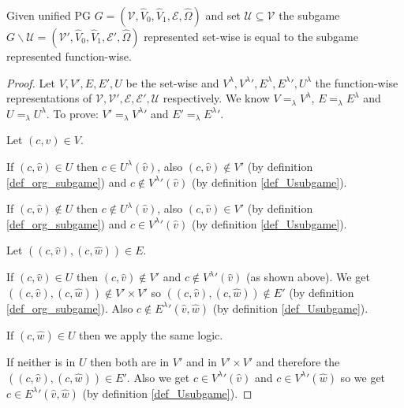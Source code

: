 \begin{lemma}
	\label{lem_subgame_eq}
	Given unified PG $G = (\mathcal{V},\hat{V}_0,\hat{V}_1, \mathcal{E}, \hat{\Omega})$ and set $\mathcal{U} \subseteq \mathcal{V}$ the subgame $G \backslash \mathcal{U} = (\mathcal{V}',\hat{V}_0,\hat{V}_1,\mathcal{E}',\hat{\Omega})$ represented set-wise is equal to the subgame represented function-wise.
	\begin{proof}
		Let $V,V',E,E',U$ be the set-wise and $V^\lambda,{V^\lambda}', E^\lambda, {E^\lambda}', U^\lambda$ the function-wise representations of $\mathcal{V},\mathcal{V}', \mathcal{E}, \mathcal{E}', \mathcal{U}$ respectively. We know $V =_\lambda V^\lambda$, $E =_\lambda E^\lambda$ and $U =_\lambda U^\lambda$. To prove: $V' =_\lambda {V^\lambda}'$ and $E' =_\lambda {E^\lambda}'$.
		
		Let $(c,\hat{v}) \in V$.
		
		If $(c,\hat{v}) \in U$ then $c \in U^\lambda(\hat{v})$, also $(c,\hat{v}) \notin V'$ (by definition \ref{def_org_subgame}) and $c \notin {V^\lambda}'(\hat{v})$ (by definition \ref{def_Usubgame}).
		
		If $(c,\hat{v}) \notin U$ then $c \notin U^\lambda(\hat{v})$, also $(c,\hat{v}) \in V'$ (by definition \ref{def_org_subgame}) and $c \in {V^\lambda}'(\hat{v})$ (by definition \ref{def_Usubgame}).
		
		Let $((c,\hat{v}),(c,\hat{w})) \in E$.
		
		If $(c,\hat{v}) \in U$ then $(c,\hat{v}) \notin V'$ and $c \notin {V^\lambda}'(\hat{v})$ (as shown above). We get $((c,\hat{v}),(c,\hat{w})) \notin V' \times V'$ so $((c,\hat{v}),(c,\hat{w})) \notin E'$ (by definition \ref{def_org_subgame}). Also $c \notin {E^\lambda}'(\hat{v},\hat{w})$ (by definition \ref{def_Usubgame}).
		
		If $(c,\hat{w}) \in U$ then we apply the same logic.
		
		If neither is in $U$ then both are in $V'$ and in $V' \times V'$ and therefore the $((c,\hat{v}),(c,\hat{w})) \in E'$. Also we get $c \in {V^\lambda}'(\hat{v})$ and $c \in {V^\lambda}'(\hat{w})$ so we get $c \in {E^\lambda}'(\hat{v},\hat{w})$ (by definition \ref{def_Usubgame}).
	\end{proof}
\end{lemma}

